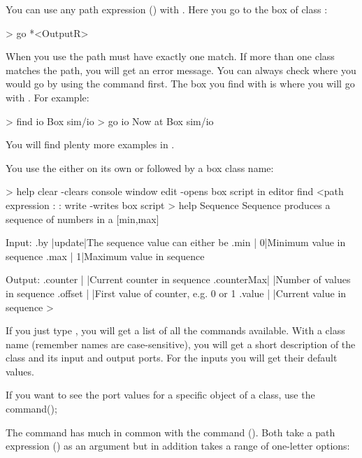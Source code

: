 You can use any path expression () with . Here you go to the box of class :
\begin{usdialog}
> go *<OutputR>
\end{usdialog}

When you use  the path must have exactly one match. If more than one class matches the path, you will get an error message. You can always check where you would go by using the  command first. The box you find with  is where you will go with . For example:
\begin{usdialog}
> find io
Box sim/io
> go io
Now at Box sim/io
\end{usdialog}

You will find plenty more examples in .

You use the  either on its own or followed by a box class name:
\begin{usdialog}
> help 
clear                  -clears console window
edit                   -opens box script in editor
find <path expression%
:
:
write                  -writes box script
> help Sequence
Sequence produces a sequence of numbers in a [min,max]%

Input:
.by        |update|The sequence value can either be %
.min       |     0|Minimum value in sequence
.max       |     1|Maximum value in sequence

Output:
.counter   |      |Current counter in sequence
.counterMax|      |Number of values in sequence
.offset    |      |First value of counter, e.g. 0 or 1
.value     |      |Current value in sequence 
>
\end{usdialog}
If you just type , you will get a list of all the commands available. With a class name (remember names are case-sensitive), you will get a short description of the class and its input and output ports. For the inputs you will get their default values. 

If you want to see the port values for a specific object of a class, use the  command();

The  command has much in common with the  command (). Both take a path expression () as an argument but  in addition takes a range of one-letter options:

